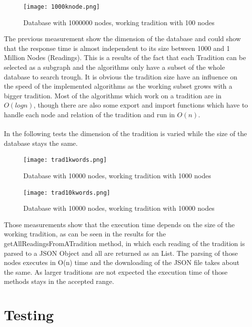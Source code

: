 \documentclass[11pt,fleqn,openany]{book} %
\begin{document}
\begin{figure}[h!]
  \caption{Database with 1000000 nodes,  working tradition with 100 nodes }
  \centering
    \texttt{[image: 1000knode.png]}
\end{figure}
The previous measurement show the dimension of the database and could show that the response time is almost independent to its size between 1000 and 1 Million Nodes (Readings). This is a results of the fact that each Tradition can be selected as a subgraph and the algorithms only have a subset of the whole database to search trough. It is obvious the tradition size have an influence on the speed of the implemented algorithms as the working subset grows with a bigger tradition. Most of the algorithms which work on a tradition are in $O(log n)$, though there are also some export and import functions which have to handle each node and relation of the tradition and run in $O(n)$. 
\\ \quad \\
In the following tests the dimension of the tradition is varied while the size of the database stays the same. 
\begin{figure}[h!]
  \caption{Database with 10000 nodes,  working tradition with 1000 nodes }
  \centering
    \texttt{[image: trad1kwords.png]}
\end{figure}
\begin{figure}[h!]
  \caption{Database with 10000 nodes,  working tradition with 10000 nodes }
  \centering
    \texttt{[image: trad10kwords.png]}
\end{figure}
Those measurements show that the execution time depends on the size of the working tradition, as can be seen in the results for the getAllReadingsFromATradition method, in which each reading of the tradition is parsed to a JSON Object and all are returned as an List. The parsing of those nodes executes in O(n) time and the downloading of the JSON file takes about the same. As larger traditions are not expected the execution time of those methods stays in the accepted range.


\part{Testing}

\end{document}
